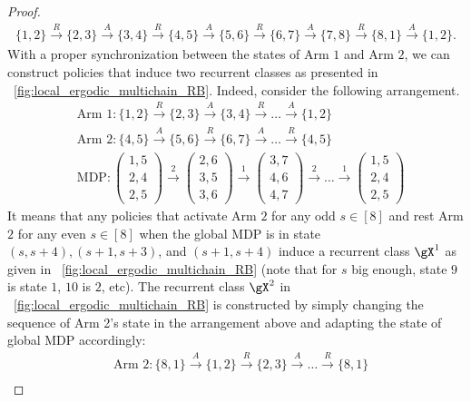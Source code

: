 \begin{proof}
    \begin{align*}
        \{1,2\} \overset{R}{\to} \{2,3\} \overset{A}{\to} \{3,4\} \overset{R}{\to} \{4,5\} \overset{A}{\to} \{5,6\} \overset{R}{\to} \{6,7\} \overset{A}{\to} \{7,8\} \overset{R}{\to} \{8,1\} \overset{A}{\to} \{1,2\}.
    \end{align*}
    With a proper synchronization between the states of Arm $1$ and Arm $2$, we can construct policies that induce two recurrent classes as presented in \figurename~\ref{fig:local_ergodic_multichain_RB}.
    Indeed, consider the following arrangement.
    \begin{align*}
        &\text{Arm 1} : \{1,2\} \overset{R}{\to} \{2,3\} \overset{A}{\to} \{3,4\} \overset{R}{\to} \dots \overset{A}{\to} \{1,2\} \\
        &\text{Arm 2} : \{4,5\} \overset{A}{\to} \{5,6\} \overset{R}{\to} \{6,7\} \overset{A}{\to} \dots \overset{R}{\to} \{4,5\} \\
        &\text{MDP} : \begin{pmatrix}1,5\\2,4\\2,5\end{pmatrix} \overset{2}{\to} \begin{pmatrix}2,6\\3,5\\3,6\end{pmatrix} \overset{1}{\to} \begin{pmatrix}3,7\\4,6\\4,7\end{pmatrix} \overset{2}{\to} \dots \overset{1}{\to} \begin{pmatrix}1,5\\2,4\\2,5\end{pmatrix}
    \end{align*}
    It means that any policies that activate Arm $2$ for any odd $s\in[8]$ and rest Arm $2$ for any even $s\in[8]$ when the global MDP is in state $(s,s+4), (s+1,s+3)$, and $(s+1,s+4)$ induce a recurrent class $\gX^1$ as given in \figurename~\ref{fig:local_ergodic_multichain_RB} (note that for $s$ big enough, state $9$ is state $1$, $10$ is $2$, etc).
    The recurrent class $\gX^2$ in \figurename~\ref{fig:local_ergodic_multichain_RB} is constructed by simply changing the sequence of Arm 2's state in the arrangement above and adapting the state of global MDP accordingly:
    \begin{align*}
        &\text{Arm 2} : \{8,1\} \overset{A}{\to} \{1,2\} \overset{R}{\to} \{2,3\} \overset{A}{\to} \dots \overset{R}{\to} \{8,1\} \\

\end{align*}
\end{proof}
